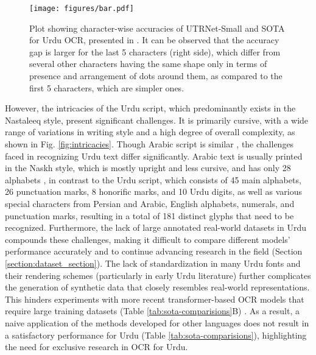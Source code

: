 \documentclass[runningheads]{llncs}
\newcommand{\ModelName}{{UTRNet}\xspace}
\begin{document}
\begin{figure}[t]
	\texttt{[image: figures/bar.pdf]}
	\caption{Plot showing character-wise accuracies of \ModelName-Small and SOTA for Urdu OCR, presented in \cite{iiith17urdu}. It can be observed that the accuracy gap is larger for the last 5 characters (right side), which differ from several other characters having the same shape only in terms of presence and arrangement of dots around them, as compared to the first 5 characters, which are simpler ones.
	}
	\label{fig:char_accuracy}
\end{figure}

However, the intricacies of the Urdu script, which predominantly exists in the Nastaleeq style, present significant challenges. It is primarily cursive, with a wide range of variations in writing style and a high degree of overall complexity, as shown in Fig. \ref{fig:intricacies}. Though Arabic script is similar \cite{arabic_intricacies}, the challenges faced in recognizing Urdu text differ significantly. Arabic text is usually printed in the Naskh style, which is mostly upright and less cursive, and has only 28 alphabets \cite{surveyArabicOCR_2023}, in contrast to the Urdu script, which consists of 45 main alphabets, 26 punctuation marks, 8 honorific marks, and 10 Urdu digits, as well as various special characters from Persian and Arabic, English alphabets, numerals, and punctuation marks, resulting in a total of 181 distinct glyphs \cite{iiith17urdu} that need to be recognized. Furthermore, the lack of large annotated real-world datasets in Urdu compounds these challenges, making it difficult to compare different models' performance accurately and to continue advancing research in the field (Section \ref{section:dataset_section}). The lack of standardization in many Urdu fonts and their rendering schemes (particularly in early Urdu literature) further complicates the generation of synthetic data that closely resembles real-world representations. This hinders experiments with more recent transformer-based OCR models that require large training datasets (Table \ref{tab:sota-comparisions}B) \cite{transformerurduocr,tttvit,vitpaper}. As a result, a naive application of the methods developed for other languages does not result in a satisfactory performance for Urdu (Table \ref{tab:sota-comparisions}), highlighting the need for exclusive research in OCR for Urdu.
\end{document}
